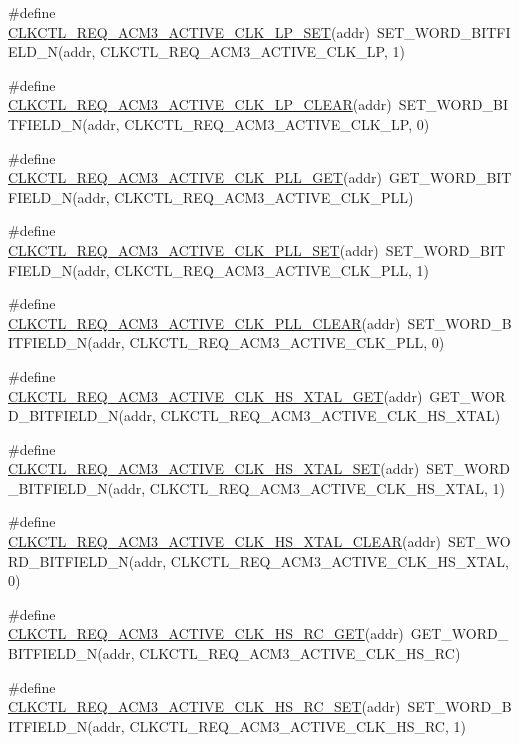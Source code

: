 \begin{DoxyCompactItemize}
\item 
\#define \hyperlink{a00544_abaf4c7c8b61e9113deae0fbade0f00f6}{CLKCTL\_\-REQ\_\-ACM3\_\-ACTIVE\_\-CLK\_\-LP\_\-SET}(addr)~SET\_\-WORD\_\-BITFIELD\_\-N(addr, CLKCTL\_\-REQ\_\-ACM3\_\-ACTIVE\_\-CLK\_\-LP, 1)
\item 
\#define \hyperlink{a00544_a5f67893dd5ac7d241cbec7e861f7ca16}{CLKCTL\_\-REQ\_\-ACM3\_\-ACTIVE\_\-CLK\_\-LP\_\-CLEAR}(addr)~SET\_\-WORD\_\-BITFIELD\_\-N(addr, CLKCTL\_\-REQ\_\-ACM3\_\-ACTIVE\_\-CLK\_\-LP, 0)
\item 
\#define \hyperlink{a00544_a8873eeadcb09cfee564947c1a8fd958c}{CLKCTL\_\-REQ\_\-ACM3\_\-ACTIVE\_\-CLK\_\-PLL\_\-GET}(addr)~GET\_\-WORD\_\-BITFIELD\_\-N(addr, CLKCTL\_\-REQ\_\-ACM3\_\-ACTIVE\_\-CLK\_\-PLL)
\item 
\#define \hyperlink{a00544_ad2714f1c835dbfe7599d5fc4fc1276ad}{CLKCTL\_\-REQ\_\-ACM3\_\-ACTIVE\_\-CLK\_\-PLL\_\-SET}(addr)~SET\_\-WORD\_\-BITFIELD\_\-N(addr, CLKCTL\_\-REQ\_\-ACM3\_\-ACTIVE\_\-CLK\_\-PLL, 1)
\item 
\#define \hyperlink{a00544_a998a07c001156c0445d148b5f2b43228}{CLKCTL\_\-REQ\_\-ACM3\_\-ACTIVE\_\-CLK\_\-PLL\_\-CLEAR}(addr)~SET\_\-WORD\_\-BITFIELD\_\-N(addr, CLKCTL\_\-REQ\_\-ACM3\_\-ACTIVE\_\-CLK\_\-PLL, 0)
\item 
\#define \hyperlink{a00544_a5c3b6a1e615bc4e548dcb9ed5a40142f}{CLKCTL\_\-REQ\_\-ACM3\_\-ACTIVE\_\-CLK\_\-HS\_\-XTAL\_\-GET}(addr)~GET\_\-WORD\_\-BITFIELD\_\-N(addr, CLKCTL\_\-REQ\_\-ACM3\_\-ACTIVE\_\-CLK\_\-HS\_\-XTAL)
\item 
\#define \hyperlink{a00544_aba7bdb8ec272f59955dcf323fc34094e}{CLKCTL\_\-REQ\_\-ACM3\_\-ACTIVE\_\-CLK\_\-HS\_\-XTAL\_\-SET}(addr)~SET\_\-WORD\_\-BITFIELD\_\-N(addr, CLKCTL\_\-REQ\_\-ACM3\_\-ACTIVE\_\-CLK\_\-HS\_\-XTAL, 1)
\item 
\#define \hyperlink{a00544_a31d6ddac8b287a07385e24b118642f59}{CLKCTL\_\-REQ\_\-ACM3\_\-ACTIVE\_\-CLK\_\-HS\_\-XTAL\_\-CLEAR}(addr)~SET\_\-WORD\_\-BITFIELD\_\-N(addr, CLKCTL\_\-REQ\_\-ACM3\_\-ACTIVE\_\-CLK\_\-HS\_\-XTAL, 0)
\item 
\#define \hyperlink{a00544_a142e147b235a15378de0a04cdcced101}{CLKCTL\_\-REQ\_\-ACM3\_\-ACTIVE\_\-CLK\_\-HS\_\-RC\_\-GET}(addr)~GET\_\-WORD\_\-BITFIELD\_\-N(addr, CLKCTL\_\-REQ\_\-ACM3\_\-ACTIVE\_\-CLK\_\-HS\_\-RC)
\item 
\#define \hyperlink{a00544_aef9e7aa94d95954786566309147aa31c}{CLKCTL\_\-REQ\_\-ACM3\_\-ACTIVE\_\-CLK\_\-HS\_\-RC\_\-SET}(addr)~SET\_\-WORD\_\-BITFIELD\_\-N(addr, CLKCTL\_\-REQ\_\-ACM3\_\-ACTIVE\_\-CLK\_\-HS\_\-RC, 1)
\item 

\end{DoxyCompactItemize}
